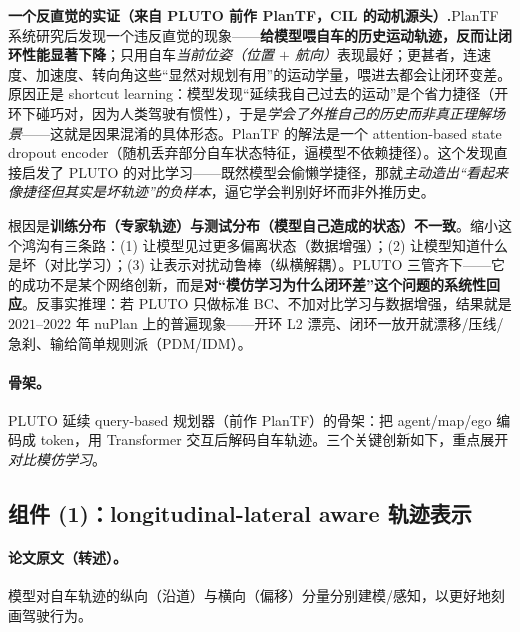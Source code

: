 \begin{note}
\textbf{一个反直觉的实证（来自 PLUTO 前作 PlanTF，CIL 的动机源头）.}\;PlanTF 系统研究后发现一个违反直觉的现象——\textbf{给模型喂自车的历史运动轨迹，反而让闭环性能显著下降}；只用自车\emph{当前位姿（位置 $+$ 航向）}表现最好；更甚者，连速度、加速度、转向角这些“显然对规划有用”的运动学量，喂进去都会让闭环变差。原因正是 shortcut learning：模型发现“延续我自己过去的运动”是个省力捷径（开环下碰巧对，因为人类驾驶有惯性），于是\emph{学会了外推自己的历史而非真正理解场景}——这就是因果混淆的具体形态。PlanTF 的解法是一个 attention-based state dropout encoder（随机丢弃部分自车状态特征，逼模型不依赖捷径）。这个发现直接启发了 PLUTO 的对比学习——既然模型会偷懒学捷径，那就\emph{主动造出“看起来像捷径但其实是坏轨迹”的负样本}，逼它学会判别好坏而非外推历史。
\end{note}

\begin{insight}
根因是\textbf{训练分布（专家轨迹）与测试分布（模型自己造成的状态）不一致}。缩小这个鸿沟有三条路：(1) 让模型见过更多偏离状态（数据增强）；(2) 让模型知道什么是坏（对比学习）；(3) 让表示对扰动鲁棒（纵横解耦）。PLUTO 三管齐下——它的成功不是某个网络创新，而是\textbf{对“模仿学习为什么闭环差”这个问题的系统性回应}。反事实推理：若 PLUTO 只做标准 BC、不加对比学习与数据增强，结果就是 $2021$--$2022$ 年 nuPlan 上的普遍现象——开环 L2 漂亮、闭环一放开就漂移/压线/急刹、输给简单规则派（PDM/IDM）。
\end{insight}

\paragraph{骨架。}
PLUTO 延续 query-based 规划器（前作 PlanTF）的骨架：把 agent/map/ego 编码成 token，用 Transformer 交互后解码自车轨迹。三个关键创新如下，重点展开\emph{对比模仿学习}。

\subsection{组件 (1)：longitudinal-lateral aware 轨迹表示}
\label{sec:de-lonlat}

\paragraph{论文原文（转述）。}
模型对自车轨迹的纵向（沿道）与横向（偏移）分量分别建模/感知，以更好地刻画驾驶行为\cite{cheng2024pluto}。

